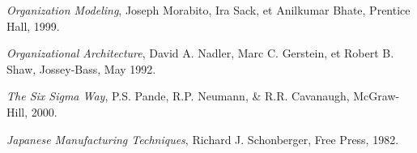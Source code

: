\documentclass[11pt,english,a4]{article}
\begin{document}
\begin{thebibliography}{99}
  {\emph{Organization Modeling}}, 
  Joseph Morabito, Ira Sack, et Anilkumar Bhate, Prentice Hall, 1999.

  {\emph{Organizational Architecture}}, 
  David A. Nadler, Marc C. Gerstein, et Robert B. Shaw, Jossey-Bass, May 1992.

  {\emph{The Six Sigma Way}}, 
  P.S. Pande, R.P. Neumann, \& R.R. Cavanaugh, McGraw-Hill, 2000.

  {\emph{Japanese Manufacturing Techniques}}, 
  Richard J. Schonberger, Free Press, 1982.


\end{thebibliography}
\end{document}
